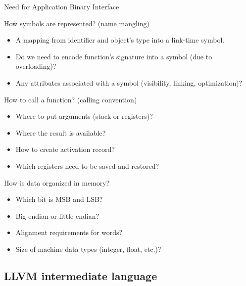 \documentclass[8pt]{beamer}
\begin{document}
\begin{frame}{Need for Application Binary Interface}
  \begin{block}{How symbols are represented? (name mangling)}
    \begin{itemize}
      \item A mapping from identifier and object's type into a link-time symbol.
      \item Do we need to encode function's signature into a symbol (due to overloading)?
      \item Any attributes associated with a symbol (visibility, linking, optimization)?
    \end{itemize}
  \end{block}
    
  \begin{block}{How to call a function? (calling convention)}
    \begin{itemize}
      \item Where to put arguments (stack or registers)?
      \item Where the result is available?
      \item How to create activation record?
      \item Which registers need to be saved and restored?
    \end{itemize}
  \end{block}

  \begin{block}{How is data organized in memory?}
    \begin{itemize}
      \item Which bit is MSB and LSB?
      \item Big-endian or little-endian?
      \item Alignment requirements for words?
      \item Size of machine data types (integer, float, etc.)?
    \end{itemize}
  \end{block}
\end{frame}

\subsection{LLVM intermediate language}
\end{document}
